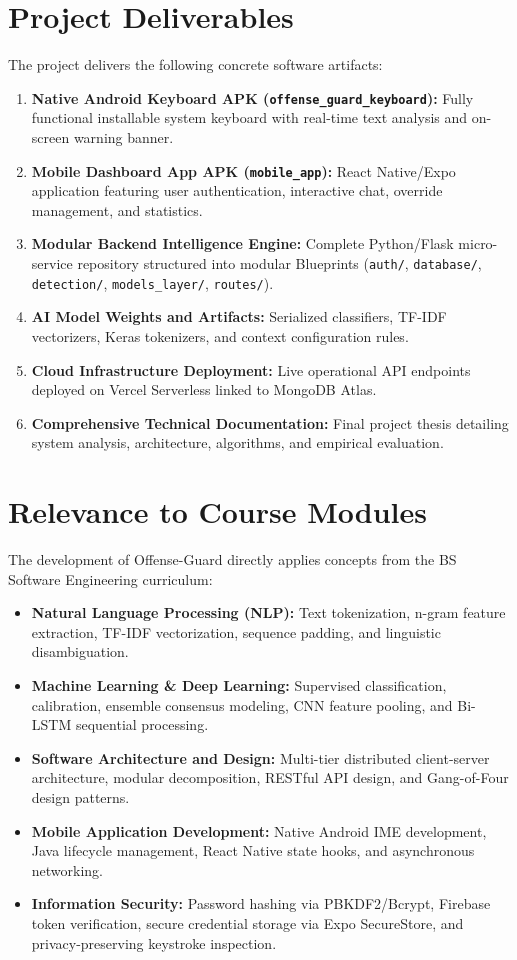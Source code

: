 \documentclass[A4paper,12pt]{report}
\theoremstyle{plain}
\theoremstyle{definition}
\theoremstyle{remark}
\numberwithin{equation}{section}
\begin{document}
\section{Project Deliverables}
The project delivers the following concrete software artifacts:
\begin{enumerate}[leftmargin=*]
    \item \textbf{Native Android Keyboard APK (\texttt{offense\_guard\_keyboard}):} Fully functional installable system keyboard with real-time text analysis and on-screen warning banner.
    \item \textbf{Mobile Dashboard App APK (\texttt{mobile\_app}):} React Native/Expo application featuring user authentication, interactive chat, override management, and statistics.
    \item \textbf{Modular Backend Intelligence Engine:} Complete Python/Flask micro-service repository structured into modular Blueprints (\texttt{auth/}, \texttt{database/}, \texttt{detection/}, \texttt{models\_layer/}, \texttt{routes/}).
    \item \textbf{AI Model Weights and Artifacts:} Serialized classifiers, TF-IDF vectorizers, Keras tokenizers, and context configuration rules.
    \item \textbf{Cloud Infrastructure Deployment:} Live operational API endpoints deployed on Vercel Serverless linked to MongoDB Atlas.
    \item \textbf{Comprehensive Technical Documentation:} Final project thesis detailing system analysis, architecture, algorithms, and empirical evaluation.
\end{enumerate}

\section{Relevance to Course Modules}
The development of Offense-Guard directly applies concepts from the BS Software Engineering curriculum:
\begin{itemize}[leftmargin=*]
    \item \textbf{Natural Language Processing (NLP):} Text tokenization, n-gram feature extraction, TF-IDF vectorization, sequence padding, and linguistic disambiguation.
    \item \textbf{Machine Learning \& Deep Learning:} Supervised classification, calibration, ensemble consensus modeling, CNN feature pooling, and Bi-LSTM sequential processing.
    \item \textbf{Software Architecture and Design:} Multi-tier distributed client-server architecture, modular decomposition, RESTful API design, and Gang-of-Four design patterns.
    \item \textbf{Mobile Application Development:} Native Android IME development, Java lifecycle management, React Native state hooks, and asynchronous networking.
    \item \textbf{Information Security:} Password hashing via PBKDF2/Bcrypt, Firebase token verification, secure credential storage via Expo SecureStore, and privacy-preserving keystroke inspection.
\end{itemize}
\end{document}
